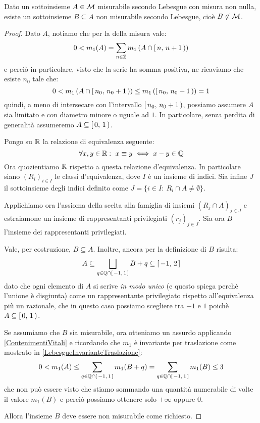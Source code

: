 \begin{theorem}
	Dato un sottoinsieme $A\in\mathcal M$ misurabile secondo Lebesgue con misura non nulla, esiste un sottoinsieme $B\subseteq A$ non misurabile secondo Lebesgue, cioè $B\not\in\mathcal M$.
\end{theorem}
\begin{proof}
	Dato $A$, notiamo che per la \sigadd[ità] della misura vale:
	\begin{equation*}
		0<m_1(A)=\sum_{n\in\mathbb Z} m_1\left(A\cap[\,n,\,n+1\,)\right)
	\end{equation*}
	e perciò in particolare, visto che la serie ha somma positiva, ne ricaviamo che esiste $n_0$ tale che:
	\begin{equation*}
		0<m_1\left(A\cap[\,n_0,\,n_0+1\,)\right)\le m_1\left([\,n_0,\,n_0+1\,)\right)=1
	\end{equation*}
	quindi, a meno di intersecare con l'intervallo $[\,n_0,\,n_0+1\,)$, possiamo assumere $A$ sia limitato e con diametro minore o uguale ad $1$. In particolare, senza perdita di generalità assumeremo $A\subseteq [\,0,\,1\,)$.
	
	Pongo su $\mathbb R$ la relazione di equivalenza seguente:
	\begin{equation*}
		\forall x,y\in\R:\ x\equiv y\iff x-y\in\mathbb Q
	\end{equation*}
	Ora quozientiamo $\mathbb R$ rispetto a questa relazione d'equivalenza. In particolare siano $(R_i)_{i\in I}$ le classi d'equivalenza, dove $I$ è un insieme di indici. Sia infine $J$ il sottoinsieme degli indici definito come $J=\{i\in I:\ R_i\cap A\not =\emptyset\}$. 

	Applichiamo ora l'assioma della scelta alla famiglia di insiemi $(R_j\cap A)_{j\in J}$ e estraiamone un insieme di rappresentanti privilegiati $(r_j)_{j\in J}$. Sia ora $B$ l'insieme dei rappresentanti privilegiati.
	
	Vale, per costruzione, $B\subseteq A$. 
	Inoltre, ancora per la definizione di $B$ risulta:
	\begin{equation}\label{ContenimentiVitali}
		A\subseteq\bigsqcup_{q\in\mathbb Q\cap[\,-1,\,1\,]} B+q\subseteq [\,-1,\,2\,]
	\end{equation}
	dato che ogni elemento di $A$ si scrive \emph{in modo unico} (e questo spiega perchè l'unione è disgiunta) come un rappresentante privilegiato rispetto all'equivalenza più un razionale, che in questo caso possiamo scegliere tra $-1$ e $1$ poichè $A\subseteq [\,0,\,1\,)$.
	
	Se assumiamo che $B$ sia misurabile, ora otteniamo un assurdo applicando \cref{ContenimentiVitali} e ricordando che $m_1$ è invariante per traslazione come mostrato in \cref{LebesgueInvarianteTraslazione}:
	\begin{equation*}
		0<m_1(A)\le \sum_{q\in \mathbb Q\cap[\,-1,\,1\,]} m_1(B+q)= \sum_{q\in \mathbb Q\cap[\,-1,\,1\,]} m_1(B) \le 3
	\end{equation*}
	che non può essere visto che stiamo sommando una quantità numerabile di volte il valore $m_1(B)$ e perciò possiamo ottenere solo $+\infty$ oppure $0$.
	
	Allora l'insieme $B$ deve essere non misurabile come richiesto.
\end{proof}

